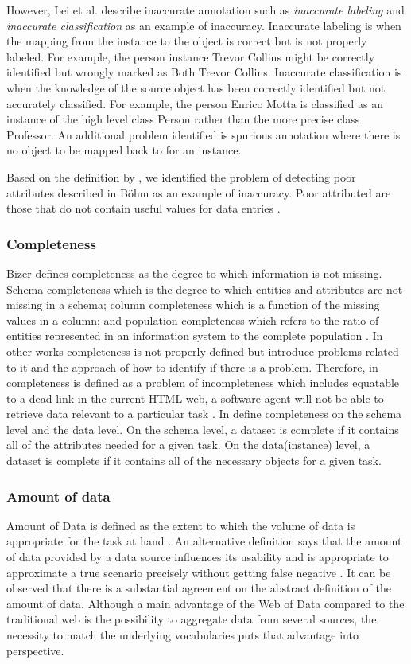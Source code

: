 However, Lei et al. describe inaccurate annotation such as \textit{inaccurate labeling} and \textit{inaccurate classification} \cite{Lei} as an example of inaccuracy. 
Inaccurate labeling is when the mapping from the instance to the object is correct but is not properly labeled. For example, the person instance Trevor Collins might be correctly identified but wrongly marked as Both Trevor Collins. 
Inaccurate classification is when the knowledge of the source object has been correctly identified but not accurately classified. 
For example, the person Enrico Motta is classified as an instance of the high level class Person rather than the more precise class Professor. 
An additional problem identified is spurious annotation where there is no object to be mapped back to for an instance. 

Based on the definition by \cite{Bizerthesis}, we identified the problem of detecting poor attributes described in B\"ohm as an example of inaccuracy.
Poor attributed are those that do not contain useful values for data entries \cite{Bohm}. 

\subsubsection{Completeness}
Bizer defines completeness as the degree to which information is not missing. Schema completeness which is the degree to which entities and attributes are not missing in a schema; column completeness which is a function of the missing values in a column; and population completeness which refers to the ratio of entities represented in an information system to the complete population \cite{Bizerthesis}. 
In other works completeness is not properly defined but introduce problems related to it and the approach of how to identify if there is a problem. Therefore, in \cite{Hogan} completeness is defined as a problem of  incompleteness which includes equatable to a dead-link in the current HTML web, a software agent will not be able to retrieve data relevant to a particular task \cite{Hogan}. In \cite{Mendes} define completeness on the schema level and the data level. On the schema level, a dataset is complete if it contains all of the attributes needed for a given task. On the data(instance) level, a dataset is complete if it contains all of the necessary objects for a given task. 

\subsubsection{Amount of data}
Amount of Data is defined as the extent to which the volume of data is appropriate
for the task at hand \cite{Bizerthesis}.
An alternative definition says that the amount of data provided by a data source influences its usability \cite{Flemming} and is appropriate to approximate a true scenario precisely without getting false negative 	\cite{Chen}. It can be observed that there is a substantial agreement on the abstract definition of the amount of data. Although a main advantage of the Web of Data compared to the traditional web is the possibility to aggregate data from several sources, the necessity to match the underlying vocabularies puts that advantage into perspective. 

